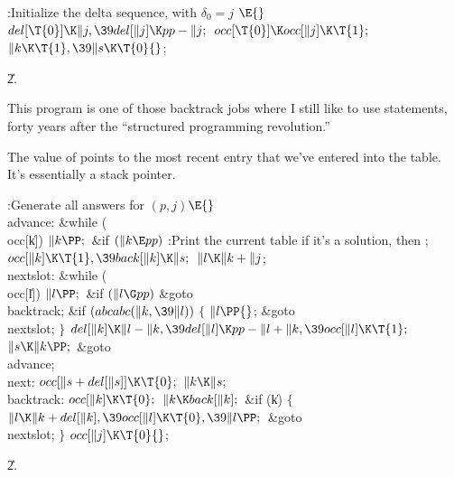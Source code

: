 \B{}:Initialize the delta sequence, with $\delta_0=j$%
\X${}\E{}$\6
$\\{del}[\T{0}]\K\|j,\39\\{del}[\|j]\K\\{pp}-\|j;{}$\6
${}\\{occ}[\T{0}]\K\\{occ}[\|j]\K\T{1};{}$\6
${}\|k\K\T{1},\39\|s\K\T{0}{}$;\par
\U2.\fi

This program is one of those backtrack jobs
where I still like to use  statements,
forty years after the ``structured programming revolution.''

The value of  points to the most recent entry that we've entered
into the  table. It's essentially a stack pointer.

\Y\B\4:Generate all answers for $(p,j)$\X${}\E{}$\6
\4\\{advance}:\5
\&{while} (\\{occ}[\|k])\1\5
${}\|k\PP;{}$\2\6
\&{if} ${}(\|k\E\\{pp}){}$\1\5
:Print the current  table if it's a solution, then \X;\2\6
${}\\{occ}[\|k]\K\T{1},\39\\{back}[\|k]\K\|s;{}$\6
${}\|l\K\|k+\|j{}$;\6
\4\\{nextslot}:\5
\&{while} (\\{occ}[\|l])\1\5
${}\|l\PP;{}$\2\6
\&{if} ${}(\|l\G\\{pp}){}$\1\5
\&{goto} \\{backtrack};\2\6
\&{if} ${}(\\{abcabc}(\|k,\39\|l)){}$\5
${}\{{}$\1\6
${}\|l\PP{}$;\5
\&{goto} \\{nextslot};\6
\4${}\}{}$\2\6
${}\\{del}[\|k]\K\|l-\|k,\39\\{del}[\|l]\K\\{pp}-\|l+\|k,\39\\{occ}[\|l]\K%
\T{1};{}$\6
${}\|s\K\|k\PP;{}$\6
\&{goto} \\{advance};\6
\4\\{next}:\5
${}\\{occ}[\|s+\\{del}[\|s]]\K\T{0};{}$\6
${}\|k\K\|s;{}$\6
\4\\{backtrack}:\5
${}\\{occ}[\|k]\K\T{0};{}$\6
${}\|k\K\\{back}[\|k];{}$\6
\&{if} (\|k)\5
${}\{{}$\1\6
${}\|l\K\|k+\\{del}[\|k],\39\\{occ}[\|l]\K\T{0},\39\|l\PP;{}$\6
\&{goto} \\{nextslot};\6
\4${}\}{}$\2\6
${}\\{occ}[\|j]\K\T{0}{}$;\par
\U2.\fi

